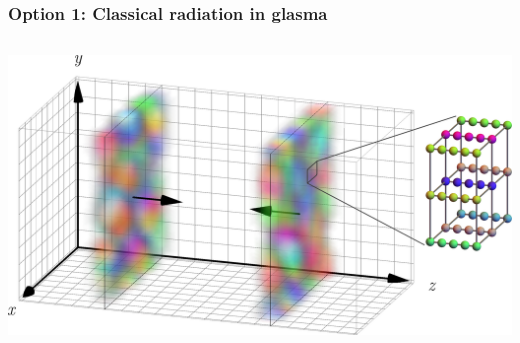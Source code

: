 \documentclass[aspectratio=169,11pt,usenames,dvipsnames]{beamer}
\begin{document}

\begin{frame}
    \frametitle{{\normalsize\color{jyured}\bfseries\sffamily Option 1: }Classical radiation in glasma}
    \vspace{-15pt}
    \begin{center}
        \begin{columns}[onlytextwidth,t]
            \vspace{5pt}
            \begin{center}
                \includegraphics[width=0.95\columnwidth]{images/cpic_overview.png}
            \end{center}


\end{columns}
\end{center}
\end{frame}
\end{document}
